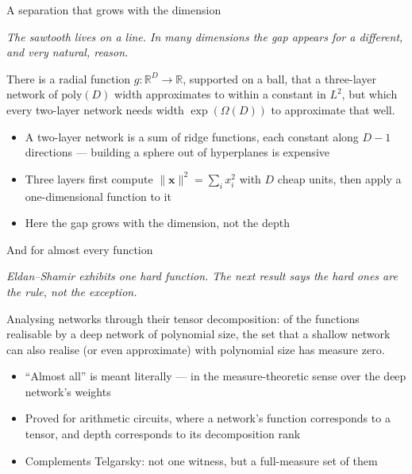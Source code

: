 \documentclass[aspectratio=169, 11pt]{beamer}
\newcommand{\bridge}[1]{%
  {\scriptsize\itshape\color{mcMuted} #1\par}\vspace{0.35em}}
\begin{document}
\begin{frame}{A separation that grows with the dimension}
  \bridge{The sawtooth lives on a line. In many dimensions the gap
  appears for a different, and very natural, reason.}
  \vspace{0.3em}
  \begin{theorem}
    {\small There is a \alert{radial} function
    $g:\mathbb{R}^{D}\to\mathbb{R}$, supported on a ball, that a
    \alert{three-layer} network of $\mathrm{poly}(D)$ width approximates
    to within a constant in $L^{2}$, but which \alert{every two-layer}
    network needs width $\exp(\Omega(D))$ to approximate that well.}
  \end{theorem}
  \vspace{0.3em}
  {\small
  \begin{itemize}\setlength{\itemsep}{1pt}
    \item A two-layer network is a sum of \alert{ridge} functions, each
          constant along $D-1$ directions --- building a sphere out of
          hyperplanes is expensive
    \item Three layers first compute
          $\lVert\mathbf{x}\rVert^{2}=\sum_i x_i^{2}$ with $D$ cheap
          units, then apply a one-dimensional function to it
    \item Here the gap grows with the \alert{dimension}, not the depth
  \end{itemize}}
\end{frame}

\begin{frame}{And for almost every function}
  \bridge{Eldan--Shamir exhibits one hard function. The next result says
  the hard ones are the rule, not the exception.}
  \vspace{0.3em}
  \begin{theorem}
    {\small Analysing networks through their \alert{tensor
    decomposition}: of the functions realisable by a deep network of
    polynomial size, the set that a shallow network can also realise
    (or even approximate) with polynomial size has
    \alert{measure zero}.}
  \end{theorem}
  \vspace{0.4em}
  {\small
  \begin{itemize}\setlength{\itemsep}{1pt}
    \item ``Almost all'' is meant literally --- in the measure-theoretic
          sense over the deep network's weights
    \item Proved for arithmetic circuits, where a network's function
          corresponds to a \alert{tensor}, and depth corresponds to its
          decomposition rank
    \item Complements Telgarsky: not one witness, but a full-measure
          set of them
  \end{itemize}}
\end{frame}
\end{document}
